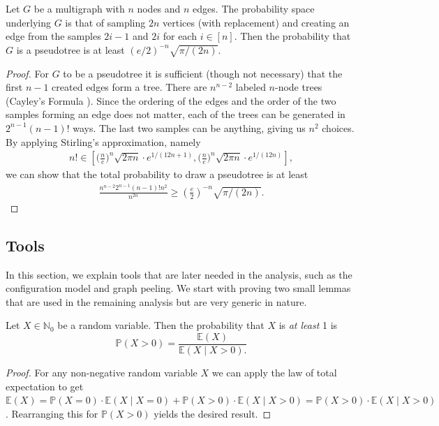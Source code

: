 \documentclass[a4paper,USenglish,cleveref]{lipics-v2021}
\begin{document}
\begin{theorem}
  \label{lem:simpleProof}
  Let $G$ be a multigraph with $n$ nodes and $n$ edges.
  The probability space underlying $G$ is that of sampling $2n$ vertices (with replacement) and creating an edge from the samples $2i-1$ and $2i$ for each $i ∈ [n]$.
  Then the probability that $G$ is a pseudotree is at least $(e/2)^{-n}\sqrt{\pi/(2n)}$.
\end{theorem}
\begin{proof}
  For $G$ to be a pseudotree it is sufficient (though not necessary) that the first $n-1$ created edges form a tree.
  There are $n^{n-2}$ labeled $n$-node trees (Cayley's Formula \cite{cayley1878theorem}).
  Since the ordering of the edges and the order of the two samples forming an edge does not matter, each of the trees can be generated in $2^{n-1}(n-1)!$ ways.
  The last two samples can be anything, giving us $n^2$ choices.
  By applying Stirling's approximation, namely
  \begin{align*}
    n! ∈ \left[\big(\tfrac{n}{e}\big)^{n}\sqrt{2 \pi n}\cdot e^{1/(12n+1)}, \big(\tfrac{n}{e}\big)^{n}\sqrt{2 \pi n} \cdot e^{1/(12n)}\right],
  \end{align*}
  we can show that the total probability to draw a pseudotree is at least
  \begin{align*}
    \frac{n^{n-2}2^{n-1}(n-1)!n^2}{n^{2n}} \geq \left(\frac{e}{2}\right)^{-n}\sqrt{\pi/(2n)}.
    \tag*{\qedhere}
  \end{align*}
\end{proof}

\subsection{Tools}\label{ss:analysisPreliminaries}
In this section, we explain tools that are later needed in the analysis, such as the configuration model and graph peeling.
We start with proving two small lemmas that are used in the remaining analysis but are very generic in nature.

\begin{lemma}
  \label{lem:expectation}
  Let $X \in \mathbb{N}_0$ be a random variable.
  Then the probability that $X$ is \emph{at least} 1 is
  \[
    ℙ(X > 0) = \frac{𝔼(X)}{𝔼(X \mid X > 0).}
  \]
\end{lemma}
\begin{proof}
  For any non-negative random variable $X$ we can apply the law of total expectation to get
  $𝔼(X) = ℙ(X = 0)·𝔼(X \mid X = 0) + ℙ(X > 0)·𝔼(X \mid X > 0) = ℙ(X > 0)·𝔼(X \mid X > 0)$.
  Rearranging this for $ℙ(X > 0)$ yields the desired result.
\end{proof}
\end{document}
